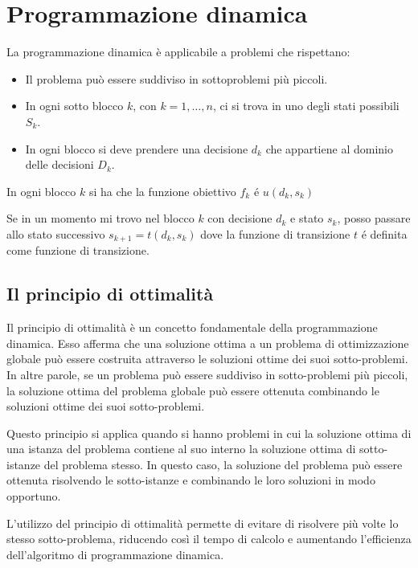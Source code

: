\chapter{Programmazione dinamica}

La programmazione dinamica \`e applicabile a problemi che rispettano:
\begin{itemize}
  \item Il problema pu\`o essere suddiviso in sottoproblemi pi\`u piccoli.
  \item In ogni sotto blocco $k$, con $k = 1, \dots, n$, ci si trova in uno degli stati
        possibili $S_k$.
  \item In ogni blocco si deve prendere una decisione $d_k$ che appartiene al dominio
        delle decisioni $D_k$.
\end{itemize}

In ogni blocco $k$ si ha che la funzione obiettivo $f_k$ \'e $u(d_k, s_k)$

Se in un momento mi trovo nel blocco $k$ con decisione $d_k$ e stato $s_k$, posso passare allo stato successivo
$s_{k+1} = t(d_k, s_k)$ dove la funzione di transizione $t$ \'e definita come funzione di transizione.




\section{Il principio di ottimalità}
Il principio di ottimalità è un concetto fondamentale della programmazione dinamica. Esso afferma che una soluzione ottima a un problema di ottimizzazione globale può essere costruita attraverso le soluzioni ottime dei suoi sotto-problemi. In altre parole, se un problema può essere suddiviso in sotto-problemi più piccoli, la soluzione ottima del problema globale può essere ottenuta combinando le soluzioni ottime dei suoi sotto-problemi.

Questo principio si applica quando si hanno problemi in cui la soluzione ottima di una istanza del problema contiene al suo interno la soluzione ottima di sotto-istanze del problema stesso. In questo caso, la soluzione del problema può essere ottenuta risolvendo le sotto-istanze e combinando le loro soluzioni in modo opportuno.

L'utilizzo del principio di ottimalità permette di evitare di risolvere più volte lo stesso sotto-problema, riducendo così il tempo di calcolo e aumentando l'efficienza dell'algoritmo di programmazione dinamica.



